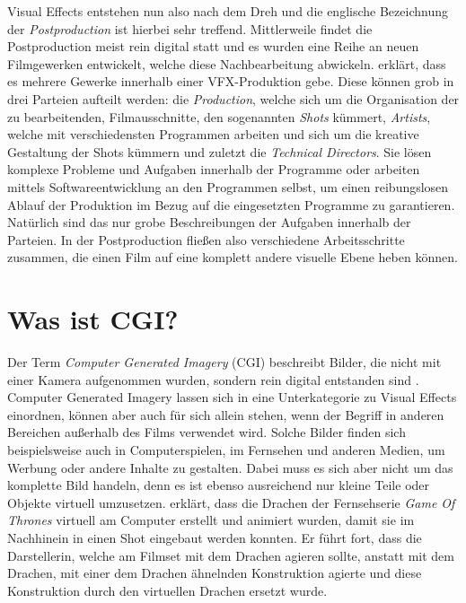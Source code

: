Visual Effects entstehen nun also nach dem Dreh und die englische Bezeichnung der \textit{Postproduction} ist hierbei sehr treffend. 
Mittlerweile findet die Postproduction meist rein digital statt und es wurden eine Reihe an neuen Filmgewerken entwickelt, welche diese Nachbearbeitung abwickeln. \citet[]{fis-eireann-2019} erklärt, dass es mehrere Gewerke innerhalb einer VFX-Produktion gebe. Diese können grob in drei Parteien aufteilt werden: die \textit{Production}, welche sich um die Organisation der zu bearbeitenden, Filmausschnitte, den sogenannten \textit{Shots} kümmert, \textit{Artists}, welche mit verschiedensten Programmen arbeiten und sich um die kreative Gestaltung der Shots kümmern und zuletzt die \textit{Technical Directors}. Sie lösen komplexe Probleme und Aufgaben innerhalb der Programme oder arbeiten mittels Softwareentwicklung an den Programmen selbst, um einen reibungslosen Ablauf der Produktion im Bezug auf die eingesetzten Programme zu garantieren. Natürlich sind das nur grobe Beschreibungen der Aufgaben innerhalb der Parteien. In der Postproduction fließen also verschiedene Arbeitsschritte zusammen, die einen Film auf eine komplett andere visuelle Ebene heben können.


\section{Was ist CGI?}
Der Term \textit{Computer Generated Imagery} (CGI) beschreibt Bilder, die nicht mit einer Kamera aufgenommen wurden, sondern rein digital entstanden sind \parencite[]{jacobs-2022}. Computer Generated Imagery lassen sich in eine Unterkategorie zu Visual Effects einordnen, können aber auch für sich allein stehen, wenn der Begriff in anderen Bereichen außerhalb des Films verwendet wird. Solche Bilder finden sich beispielsweise auch in Computerspielen, im Fernsehen und anderen Medien, um Werbung oder andere Inhalte zu gestalten. Dabei muss es sich aber nicht um das komplette Bild handeln, denn es ist ebenso ausreichend nur kleine Teile oder Objekte virtuell umzusetzen. \citet[]{feldman-2019} erklärt, dass die Drachen der Fernsehserie \textit{Game Of Thrones} virtuell am Computer erstellt und animiert wurden, damit sie im Nachhinein in einen Shot eingebaut werden konnten. Er führt fort, dass die Darstellerin, welche am Filmset mit dem Drachen agieren sollte, anstatt mit dem Drachen, mit einer dem Drachen ähnelnden Konstruktion agierte und diese Konstruktion durch den virtuellen Drachen ersetzt wurde.\\

